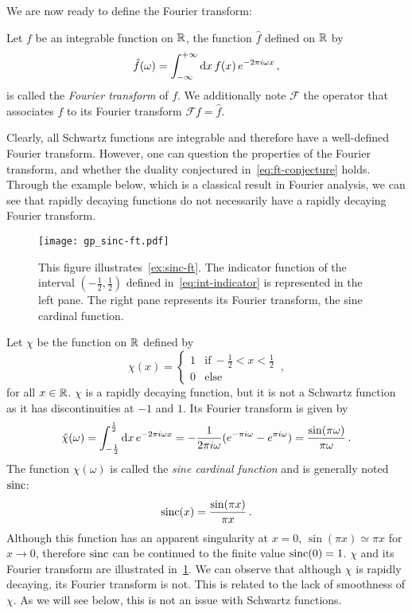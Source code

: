 We are now ready to define the Fourier transform:
\begin{definition}
  Let $f$ be an integrable function on $\mathbb{R}$, the function $\hat{f}$ defined on $\mathbb{R}$ by
  \begin{equation}
    \hat{f}(\omega)=\int_{-\infty}^{+\infty}\mathrm{d} x\,f(x)\,e^{-2\pi i\omega x}\,,
  \end{equation}
  is called the \emph{Fourier transform} of $f$. We additionally note $\mathcal{F}$ the
  operator that associates $f$ to its Fourier transform $\mathcal{F}f=\hat{f}$.
\end{definition}
Clearly, all Schwartz functions are integrable and therefore have a well-defined Fourier
transform. However, one can question the properties of the Fourier transform, and whether
the duality conjectured in~\cref{eq:ft-conjecture} holds. Through the example below, which
is a classical result in Fourier analysis, we can see that rapidly decaying functions do
not necessarily have a rapidly decaying Fourier transform.
\begin{figure}[t]
  \centering
  \texttt{[image: gp\_sinc-ft.pdf]}
  \caption{This figure illustrates~\cref{ex:sinc-ft}. The indicator function of the
    interval $(-\frac{1}{2},\frac{1}{2})$ defined in~\cref{eq:int-indicator} is
    represented in the left pane. The right pane represents its Fourier transform, the
  sine cardinal function.}
  \label{fig:sinc-ft}
\end{figure}
\begin{example}
  \label{ex:sinc-ft}
  Let $\chi$ be the function on $\mathbb{R}$ defined by
  \begin{equation}
    \chi(x)=
    \begin{cases}
      1&\text{if}~-\frac{1}{2}<x<\frac{1}{2}\\
      0&\text{else}
    \end{cases}\,,
    \label{eq:int-indicator}
  \end{equation}
  for all $x\in\mathbb{R}$. $\chi$ is a rapidly decaying function, but it is not a Schwartz
  function as it has discontinuities at $-1$ and $1$. Its Fourier transform is given by
  \begin{equation}
    \hat{\chi}(\omega)=\int_{-\frac12}^{\frac12}\mathrm{d} x\,e^{-2\pi i\omega x}=
    -\frac{1}{2\pi i\omega}(e^{-\pi i\omega}-e^{\pi i\omega})
    =\frac{\sin(\pi\omega)}{\pi\omega}\,.
  \end{equation}
  The function $\hat{\chi}(\omega)$ is called the \emph{sine cardinal function} and is
  generally noted $\operatorname{sinc}$:
  \begin{equation}
    \operatorname{sinc}(x)=\frac{\sin(\pi x)}{\pi x}\,.
  \end{equation}
  Although this function has an apparent singularity at $x=0$, $\sin(\pi x)\simeq \pi x$
  for $x\to0$, therefore $\operatorname{sinc}$ can be continued to the finite value $\operatorname{sinc}(0)=1$. $\chi$
  and its Fourier transform are illustrated in~\cref{fig:sinc-ft}. We can observe that
  although $\chi$ is rapidly decaying, its Fourier transform is not. This is related to
  the lack of smoothness of $\chi$. As we will see below, this is not an issue with
  Schwartz functions.
\end{example}
